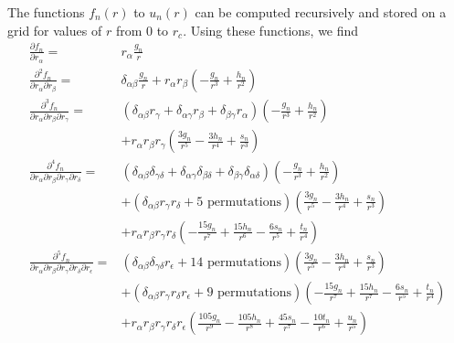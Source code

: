 The functions $f_n(r)$ to $u_n(r)$ can be computed recursively and
stored on a grid for values of $r$ from $0$ to $r_c$.  Using these
functions, we find
%
\begin{align}
\frac{\partial f_n}{\partial r_\alpha} =&r_\alpha \frac {g_n}{r} \label{eq:b9}\\
\frac{\partial^2 f_n}{\partial r_\alpha \partial r_\beta} =&\delta_{\alpha \beta}\frac {g_n}{r} 
+r_\alpha r_\beta \left( -\frac{g_n}{r^3} +\frac{h_n}{r^2}\right) \\
\frac{\partial^3 f_n}{\partial r_\alpha \partial r_\beta \partial r_\gamma} =&
\left( \delta_{\alpha \beta} r_\gamma + \delta_{\alpha \gamma} r_\beta + 
\delta_{ \beta \gamma} r_\alpha \right)  
\left(  -\frac{g_n}{r^3} +\frac{h_n}{r^2} \right) \nonumber \\
& + r_\alpha r_\beta r_\gamma 
\left(  \frac{3g_n}{r^5}-\frac{3h_n}{r^4} +\frac{s_n}{r^3} \right) \\
\frac{\partial^4 f_n}{\partial r_\alpha \partial r_\beta \partial
  r_\gamma \partial r_\delta} =& 
\left( \delta_{\alpha \beta} \delta_{\gamma \delta} 
+ \delta_{\alpha \gamma} \delta_{\beta \delta}
 +\delta_{ \beta \gamma} \delta_{\alpha \delta} \right)
\left( - \frac{g_n}{r^3} + \frac{h_n}{r^2} \right)  \nonumber \\ 
&+ \left( \delta_{\alpha \beta} r_\gamma r_\delta
+ \text{5 permutations}
\right) \left( \frac{3 g_n}{r^5} - \frac{3h_n}{r^4} + \frac{s_n}{r^3} 
\right) \nonumber \\
&+ r_\alpha r_\beta r_\gamma r_\delta
\left(  -\frac{15g_n}{r^7} + \frac{15h_n}{r^6} - \frac{6s_n}{r^5}
+ \frac{t_n}{r^4} \right)\\
\frac{\partial^5 f_n}
{\partial r_\alpha \partial r_\beta \partial r_\gamma \partial
  r_\delta \partial r_\epsilon} =& 
\left( \delta_{\alpha \beta} \delta_{\gamma \delta} r_\epsilon
+ \text{14 permutations} \right) 
\left(  \frac{3g_n}{r^5}-\frac{3h_n}{r^4} +\frac{s_n}{r^3} \right) \nonumber \\
&+ \left( \delta_{\alpha \beta} r_\gamma r_\delta r_\epsilon
+ \text{9 permutations}
\right) \left(- \frac{15g_n}{r^7}+\frac{15h_n}{r^7} -\frac{6s_n}{r^5} +\frac{t_n}{r^4} 
\right) \nonumber \\
&+ r_\alpha r_\beta r_\gamma r_\delta r_\epsilon
\left(  \frac{105g_n}{r^9} - \frac{105h_n}{r^8} + \frac{45s_n}{r^7}
- \frac{10t_n}{r^6} +\frac{u_n}{r^5} \right) \label{eq:b13}
\end{align}
%
%
%
\newpage
